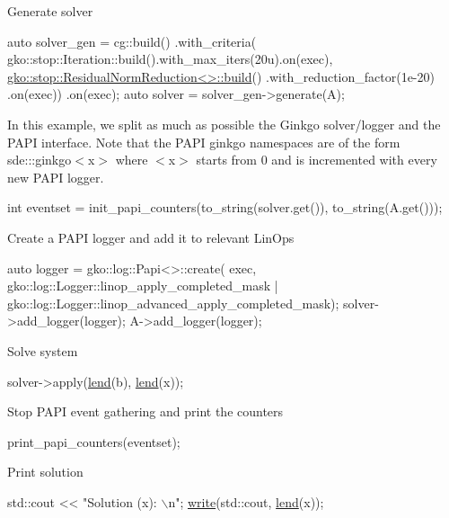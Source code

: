 Generate solver


\begin{DoxyCode}
\textcolor{keyword}{auto} solver\_gen =
    cg::build()
        .with\_criteria(
            gko::stop::Iteration::build().with\_max\_iters(20u).on(exec),
            \hyperlink{classgko_1_1stop_1_1ResidualNormReduction}{gko::stop::ResidualNormReduction<>::build}()
                .with\_reduction\_factor(1e-20)
                .on(exec))
        .on(exec);
\textcolor{keyword}{auto} solver = solver\_gen->generate(A);
\end{DoxyCode}


In this example, we split as much as possible the Ginkgo solver/logger and the P\+A\+PI interface. Note that the P\+A\+PI ginkgo namespaces are of the form sde\+:\+::ginkgo$<$x$>$ where $<$x$>$ starts from 0 and is incremented with every new P\+A\+PI logger.


\begin{DoxyCode}
\textcolor{keywordtype}{int} eventset =
    init\_papi\_counters(to\_string(solver.get()), to\_string(A.get()));
\end{DoxyCode}


Create a P\+A\+PI logger and add it to relevant Lin\+Ops


\begin{DoxyCode}
\textcolor{keyword}{auto} logger = gko::log::Papi<>::create(
    exec, gko::log::Logger::linop\_apply\_completed\_mask |
              gko::log::Logger::linop\_advanced\_apply\_completed\_mask);
solver->add\_logger(logger);
A->add\_logger(logger);
\end{DoxyCode}


Solve system


\begin{DoxyCode}
solver->apply(\hyperlink{namespacegko_aa8cb4876b72e5e1036ea9575443c439b}{lend}(b), \hyperlink{namespacegko_aa8cb4876b72e5e1036ea9575443c439b}{lend}(x));
\end{DoxyCode}


Stop P\+A\+PI event gathering and print the counters


\begin{DoxyCode}
print\_papi\_counters(eventset);
\end{DoxyCode}


Print solution


\begin{DoxyCode}
std::cout << \textcolor{stringliteral}{"Solution (x): \(\backslash\)n"};
\hyperlink{namespacegko_a859dc47a462721d83728d91ab7fa2148}{write}(std::cout, \hyperlink{namespacegko_aa8cb4876b72e5e1036ea9575443c439b}{lend}(x));
\end{DoxyCode}


